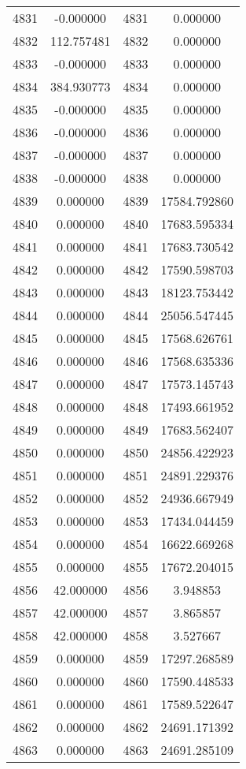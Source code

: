 \documentclass[12pt]{article}
\begin{document}
\begin{longtable}{@{}cccc@{}}
4831 & -0.000000 & 4831 & 0.000000 \\
4832 & 112.757481 & 4832 & 0.000000 \\
4833 & -0.000000 & 4833 & 0.000000 \\
4834 & 384.930773 & 4834 & 0.000000 \\
4835 & -0.000000 & 4835 & 0.000000 \\
4836 & -0.000000 & 4836 & 0.000000 \\
4837 & -0.000000 & 4837 & 0.000000 \\
4838 & -0.000000 & 4838 & 0.000000 \\
4839 & 0.000000 & 4839 & 17584.792860 \\
4840 & 0.000000 & 4840 & 17683.595334 \\
4841 & 0.000000 & 4841 & 17683.730542 \\
4842 & 0.000000 & 4842 & 17590.598703 \\
4843 & 0.000000 & 4843 & 18123.753442 \\
4844 & 0.000000 & 4844 & 25056.547445 \\
4845 & 0.000000 & 4845 & 17568.626761 \\
4846 & 0.000000 & 4846 & 17568.635336 \\
4847 & 0.000000 & 4847 & 17573.145743 \\
4848 & 0.000000 & 4848 & 17493.661952 \\
4849 & 0.000000 & 4849 & 17683.562407 \\
4850 & 0.000000 & 4850 & 24856.422923 \\
4851 & 0.000000 & 4851 & 24891.229376 \\
4852 & 0.000000 & 4852 & 24936.667949 \\
4853 & 0.000000 & 4853 & 17434.044459 \\
4854 & 0.000000 & 4854 & 16622.669268 \\
4855 & 0.000000 & 4855 & 17672.204015 \\
4856 & 42.000000 & 4856 & 3.948853 \\
4857 & 42.000000 & 4857 & 3.865857 \\
4858 & 42.000000 & 4858 & 3.527667 \\
4859 & 0.000000 & 4859 & 17297.268589 \\
4860 & 0.000000 & 4860 & 17590.448533 \\
4861 & 0.000000 & 4861 & 17589.522647 \\
4862 & 0.000000 & 4862 & 24691.171392 \\
4863 & 0.000000 & 4863 & 24691.285109 \\

\end{longtable}
\end{document}
